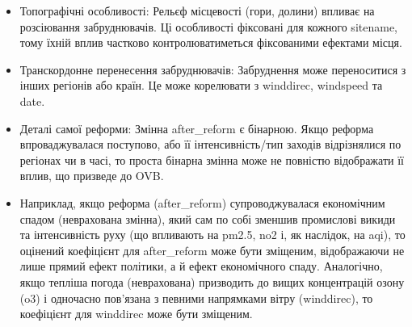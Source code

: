 \documentclass{article}
\begin{document}
\begin{enumerate}
\begin{itemize}
\begin{itemize}
\begin{itemize}
            \end{itemize}
            \item Топографічні особливості: Рельєф місцевості (гори, долини) впливає на розсіювання забруднювачів. Ці особливості фіксовані для кожного sitename, тому їхній вплив частково контролюватиметься фіксованими ефектами місця.
            \item Транскордонне перенесення забруднювачів: Забруднення може переноситися з інших регіонів або країн. Це може корелювати з winddirec, windspeed та date.
            \item Деталі самої реформи: Змінна after\_reform є бінарною. Якщо реформа впроваджувалася поступово, або її інтенсивність/тип заходів відрізнялися по регіонах чи в часі, то проста бінарна змінна може не повністю відображати її вплив, що призведе до OVB.
            \item Наприклад, якщо реформа (after\_reform) супроводжувалася економічним спадом (неврахована змінна), який сам по собі зменшив промислові викиди та інтенсивність руху (що впливають на pm2.5, no2 і, як наслідок, на aqi), то оцінений коефіцієнт для after\_reform може бути зміщеним, відображаючи не лише прямий ефект політики, а й ефект економічного спаду. Аналогічно, якщо тепліша погода (неврахована) призводить до вищих концентрацій озону (o3) і одночасно пов'язана з певними напрямками вітру (winddirec), то коефіцієнт для winddirec може бути зміщеним.
        \end{itemize}
    \end{itemize}


\end{enumerate}
\end{document}
